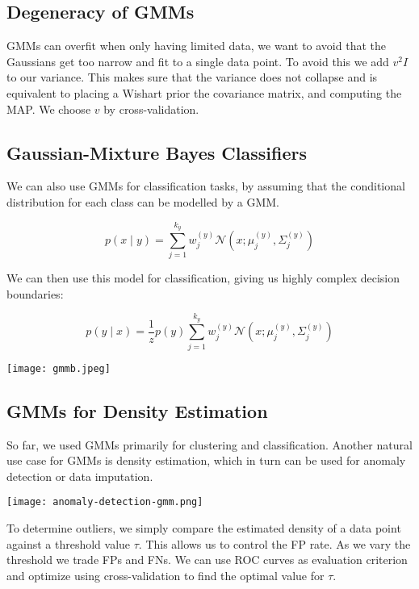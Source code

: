 \subsection{Degeneracy of GMMs}

GMMs can overfit when only having limited data, we want to avoid that the Gaussians get too narrow and fit to a single data point. To avoid this we add $v^2 I$ to our variance. This makes sure that the variance does not collapse and is equivalent to placing a Wishart prior the covariance matrix, and computing the MAP. We choose $v$ by cross-validation.

\subsection{Gaussian-Mixture Bayes Classifiers}

We can also use GMMs for classification tasks, by assuming that the conditional distribution for each class can be modelled by a GMM.

$$p(x \; | \; y) = \sum_{j=1}^{k_y} w_j^{(y)} \mathcal{N}(x; \mu_j^{(y)}, \Sigma_j^{(y)})$$

We can then use this model for classification, giving us highly complex decision boundaries:

$$p(y \; | \; x) = \frac{1}{z} p(y)  \sum_{j=1}^{k_y} w_j^{(y)} \mathcal{N}(x; \mu_j^{(y)}, \Sigma_j^{(y)})$$

\begin{center}
	\texttt{[image: gmmb.jpeg]}
\end{center}

\subsection{GMMs for Density Estimation}

So far, we used GMMs primarily for clustering and classification. Another natural use case for GMMs is density estimation, which in turn can be used for anomaly detection or data imputation.

\begin{center}
	\texttt{[image: anomaly-detection-gmm.png]}
\end{center}

To determine outliers, we simply compare the estimated density of a data point against a threshold value $\tau$. This allows us to control the FP rate. As we vary the threshold we trade FPs and FNs. We can use ROC curves as evaluation criterion and optimize using cross-validation to find the optimal value for $\tau$.

